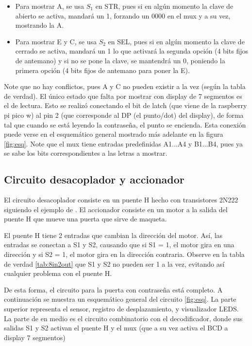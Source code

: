 \documentclass[conference]{IEEEtran}  %
\begin{document}
\begin{itemize}
    \item Para mostrar A, se usa $S_1$ en STR, pues si en algún momento la clave de abierto se activa, mandará un 1, forzando un $0000$ en el mux y a su vez, mostrando la A.

    \item Para mostrar E y C, se usa $S_2$ en SEL, pues si en algún momento la clave de cerrado se activa, mandará un 1 lo que activará la segunda opción (4 bits fijos de antemano) y si no se pone la clave, se mantendrá un 0, poniendo la primera opción (4 bits fijos de antemano para poner la E).
    
\end{itemize}

Note que no hay conflictos, pues A y C no pueden existir a la vez (según la tabla de verdad). El único estado que falta por mostrar con display de 7 segmentos es el de lectura. Esto se realizó conectando el bit de latch (que viene de la raspberry pi pico w) al pin 2 (que corresponde al DP (el punto/dot) del display), de forma tal que cuando se está leyendo la contraseña, el punto se encienda. Esta conexión puede verse en el esquemático general mostrado más adelante en la figura \ref{fig:esq}. Note que el mux tiene entradas predefinidas A1...A4 y B1...B4, pues ya se sabe los bits correspondientes a las letras a mostrar.

\subsection{Circuito desacoplador y accionador}

El circuito desacoplador consiste en un puente H hecho con transistores 2N222 siguiendo el ejemplo de \cite{makordoba2025circuitoH}. El accionador consiste en un motor a la salida del puente H que mueve una puerta que sirve de maqueta. 

El puente H tiene 2 entradas que cambian la dirección del motor. Así, las entradas se conectan a S1 y S2, causando que si S1 = 1, el motor gira en una dirección y si S2 = 1, el motor gira en la dirección contraria. Observe en la tabla de verdad \ref{tab:8in2out} que S1 y S2 no pueden ser 1 a la vez, evitando así cualquier problema con el puente H.

De esta forma, el circuito para la puerta con contraseña está completo. A continuación se muestra un esquemático general del circuito \ref{fig:esq}. La parte superior representa el sensor, registro de desplazamiento, y visualizador LEDS. La parte de en medio es el circuito combinatorio con el decodificador, donde sus salidas S1 y S2 activan el puente H y el mux (que a su vez activa el BCD a display 7 segmentos)
\end{document}
